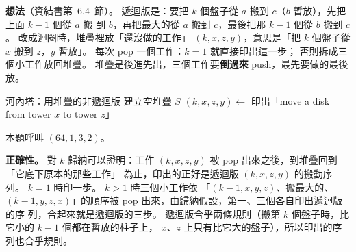 \begin{pastsoln}
\textbf{想法}（資結書第~6.4~節）。 遞迴版是：要把 $k$ 個盤子從 $a$ 搬到 $c$（$b$ 暫放），先把上面 $k - 1$ 個從 $a$ 搬
到 $b$，再把最大的從 $a$ 搬到 $c$，最後把那 $k - 1$ 個從 $b$ 搬到 $c$。 改成迴圈時，堆疊裡放「還沒做的工作」
$(k, x, z, y)$，意思是「把 $k$ 個盤子從 $x$ 搬到 $z$，$y$ 暫放」。 每次 pop 一個工作：$k = 1$ 就直接印出這一步；
否則拆成三個小工作放回堆疊。 堆疊是後進先出，三個工作要\textbf{倒過來} push，最先要做的最後放。

\begin{pseudo}{河內塔：用堆疊的非遞迴版}
 
    \State 建立空堆疊 $S$
    \State {}
        \State $(k, x, z, y) \gets$ 
            \State 印出「move a disk from tower $x$ to tower $z$」
        \Else
            \State {} 
            \State {} 
            \State {} 
        \EndIf
    \EndWhile
\EndProcedure
\end{pseudo}
本題呼叫 $(64, 1, 3, 2)$。

\textbf{正確性。} 對 $k$ 歸納可以證明：工作 $(k, x, z, y)$ 被 pop 出來之後，到堆疊回到「它底下原本的那些工作」
為止，印出的正好是遞迴版 $(k, x, z, y)$ 的搬動序列。 $k = 1$ 時印一步。 $k > 1$ 時三個小工作依
「$(k-1, x, y, z)$、搬最大的、$(k-1, y, z, x)$」的順序被 pop 出來，由歸納假設，第一、三個各自印出遞迴版的序
列，合起來就是遞迴版的三步。 遞迴版合乎兩條規則（搬第 $k$ 個盤子時，比它小的 $k - 1$ 個都在暫放的柱子上，
$x$、$z$ 上只有比它大的盤子），所以印出的序列也合乎規則。


\end{pastsoln}
